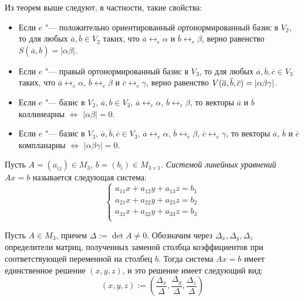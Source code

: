 \begin{note}
	Из теорем выше следуют, в частности, такие свойства:
	\begin{itemize}
		\item Если $e$ "--- положительно ориентированный ортонормированный базис в $V_2$, то для любых $\overline a, \overline b \in V_2$ таких, что $\overline a \leftrightarrow_e \alpha$ и $\overline b \leftrightarrow_e \beta$, верно равенство $S(\overline{a}, \overline{b}) = |\alpha\beta|$.
		\item Если $e$ "--- правый ортонормированный базис в $V_3$, то для любых $\overline a, \overline b, \overline c \in V_3$ таких, что $\overline a \leftrightarrow_e \alpha$, $\overline b \leftrightarrow_e \beta$ и $\overline c \leftrightarrow_e \gamma$, верно равенство $V(\overline{a}, \overline{b}, \overline{c}) \hm{=} |\alpha\beta\gamma|$.
		\item Если $e$ "--- базис в $V_2$, $\overline a, \overline b \in V_2$, $\overline a \leftrightarrow_e \alpha$, $\overline b \leftrightarrow_e \beta$, то векторы $\overline{a}$ и $\overline{b}$ коллинеарны $\Leftrightarrow$ $|\alpha\beta| = 0$.
		\item Если $e$ "--- базис в $V_3$, $\overline a, \overline b, \overline c \in V_3$, $\overline a \leftrightarrow_e \alpha$, $\overline b \leftrightarrow_e \beta$, $\overline c \leftrightarrow_e \gamma$, то векторы $\overline{a}$, $\overline{b}$ и $\overline{c}$ компланарны $\Leftrightarrow$ $|\alpha\beta\gamma| = 0$.
	\end{itemize}
\end{note}

\begin{definition}
	Пусть $A = (a_{ij}) \in M_{3}$, $b = (b_i) \in M_{3 \times 1}$. \textit{Системой линейных уравнений} $Ax = b$ называется следующая система:
	\[
	\left\{
	\begin{aligned}
	a_{11}x + a_{12}y + a_{13}z = b_1\\
	a_{21}x + a_{22}y + a_{23}z = b_2\\
	a_{31}x + a_{32}y + a_{33}z = b_3\\
	\end{aligned}
	\right.
	\]
\end{definition}

\begin{theorem}
	Пусть $A\in M_3$, причем $\Delta := \det A \ne 0$. Обозначим через $\Delta_x, \Delta_y, \Delta_z$ определители матриц, полученных заменой столбца коэффициентов при соответствующей переменной на столбец $b$. Тогда система $Ax = b$ имеет единственное решение $(x, y, z)$, и это решение имеет следующий вид:
	\[(x, y, z) := \left(\frac{\Delta_x}{\Delta}, \frac{\Delta_y}{\Delta}, \frac{\Delta_z}{\Delta}\right)\]
\end{theorem}

